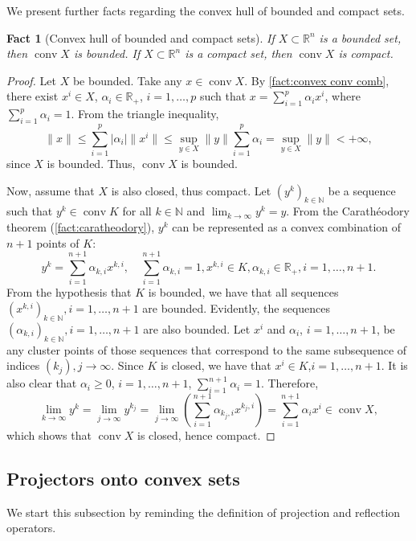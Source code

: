 \documentclass[smallextended,numbook,nospthms]{svjour3}
\theoremstyle{plain}
\newtheorem{fact}[theorem]{Fact}
\theoremstyle{definition}
\def\RR{\mathds R}
\def\NN{\mathds N}
\begin{document}
We present further facts regarding the convex hull of bounded and compact sets.
\begin{fact}[Convex hull of bounded and compact sets]\label{fact:conv hull bounded}
If $X \subset \RR^n$ is a bounded set, then $\operatorname{conv} X$ is bounded.
If $X \subset \RR^n$ is a compact set, then $\operatorname{conv} X$ is compact.
\end{fact}	
\begin{proof}
	Let $X$ be bounded. Take any $x \in \operatorname{conv} X$. By \cref{fact:convex conv comb}, there exist $x^{i} \in X$, $\alpha_{i} \in \RR_{+}$, $i=1,\ldots,p$ such that $x=\sum_{i=1}^{p}\alpha_{i}x^{i}$, where $\sum_{i=1}^{p} \alpha_{i}=1$. From the triangle inequality,
	\[
	\|x\| \leq \sum_{i=1}^{p}|\alpha_{i}|\|x^{i}\| \leq \sup_{y \in X}\|y\| \sum_{i=1}^{p}\alpha_{i}= \sup_{y \in X}\|y\| < +\infty,
	\]
	since $X$ is bounded. Thus, $\operatorname{conv} X$ is bounded.
	
	Now, assume that $X$ is also closed, thus compact. Let $(y^k)_{k \in \NN}$ be a sequence such that $y^k \in \operatorname{conv} K$ for all $k \in \NN$ and $\lim_{k \rightarrow \infty} y^k=y$. From the Carathéodory theorem (\cref{fact:caratheodory}), $y^k$ can be represented as a convex combination of $n+1$ points of $K$:
	\begin{equation}
		y^{k}=\sum_{i=1}^{n+1} \alpha_{k, i} x^{k, i}, \quad \sum_{i=1}^{n+1} \alpha_{k, i}=1, x^{k, i} \in K, \alpha_{k, i} \in \RR_{+}, i=1, \ldots, n+1.
	\end{equation}
	From the hypothesis that $K$ is bounded, we have that all sequences $(x^{k,i})_{k \in \NN}, i=1,\ldots,n+1$ are bounded. Evidently, the sequences $(\alpha_{k,i})_{k \in \NN}, i=1,\ldots,n+1$ are also bounded. Let $x^{i}$ and $\alpha_{i}$, $i=1,\ldots,n+1$, be any cluster points of those sequences that correspond to the same subsequence of indices $(k_j), j \rightarrow \infty$. Since $K$ is closed, we have that $x^i \in K$,$i=1,\ldots,n+1$. It is also clear that $\alpha_{i} \geq 0$, $i=1,\ldots,n+1$, $\sum_{i=1}^{n+1}\alpha_{i}=1$. Therefore,
	\[
	\lim _{k \rightarrow \infty} y^{k}=\lim _{j \rightarrow \infty} y^{k_{j}}=\lim _{j \rightarrow \infty}\left(\sum_{i=1}^{n+1} \alpha_{k_{j}, i} x^{k_{j}, i}\right)=\sum_{i=1}^{n+1} \alpha_{i} x^{i} \in \operatorname{conv} X,
	\]
	which shows that $\operatorname{conv} X$ is closed, hence compact.
\end{proof}

\subsection{Projectors onto convex sets}\label{subsec:proj convex}
We start this subsection by reminding the definition of projection and reflection operators.
\end{document}
